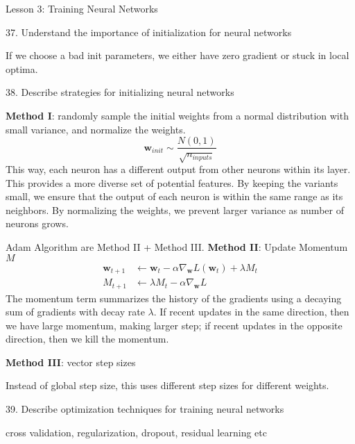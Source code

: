 \documentclass[sutton_barto_notes.tex]{subfiles}
\begin{document}
Lesson 3: Training Neural Networks 

37. Understand the importance of initialization for neural networks 

If we choose a bad init parameters, we either have zero gradient or stuck in local optima.

38. Describe strategies for initializing neural networks 

\textbf{Method I}: randomly sample the initial weights from a normal distribution with small variance, and normalize the weights.
$$\bm{w}_{init}\sim \frac{N(0,1)}{\sqrt{n_{inputs}}}$$
This way, each neuron has a different output from other neurons within its layer. This provides a more diverse set of potential features. By keeping the variants small, we ensure that the output of each neuron is within the same range as its neighbors. By normalizing the weights, we prevent larger variance as number of neurons grows.

Adam Algorithm are Method II + Method III.
\textbf{Method II}: Update Momentum $M$
\begin{align*}
\bm{w}_{t+1} &\leftarrow \bm{w}_t - \alpha \nabla_{\bm{w}}L(\bm{w}_t)+\lambda M_t \\
M_{t+1} &\leftarrow \lambda M_t - \alpha \nabla_{\bm{w}}L
\end{align*}
The momentum term summarizes the history of the gradients using a decaying sum of gradients with decay rate $\lambda$. If recent updates in the same direction, then we have large momentum, making larger step; if recent updates in the opposite direction, then we kill the momentum.

\textbf{Method III}: vector step sizes

Instead of global step size, this uses different step sizes for different weights.

39. Describe optimization techniques for training neural networks

cross validation, regularization, dropout, residual learning etc
\end{document}
